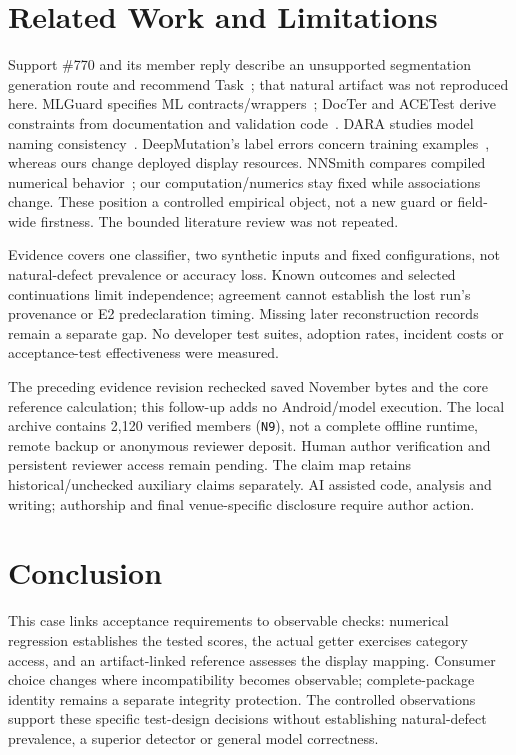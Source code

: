 \documentclass[10pt,conference]{IEEEtran}
\newcommand{\code}[1]{\texttt{#1}}
\begin{document}
\section{Related Work and Limitations}
\label{sec:related}
Support \#770 and its member reply describe an unsupported segmentation generation route and recommend Task~\cite{support770,support770reply}; that natural artifact was not reproduced here. MLGuard specifies ML contracts/wrappers~\cite{mlguard}; DocTer and ACETest derive constraints from documentation and validation code~\cite{docter,acetest}. DARA studies model naming consistency~\cite{dara}. DeepMutation's label errors concern training examples~\cite{deepmutation}, whereas ours change deployed display resources. NNSmith compares compiled numerical behavior~\cite{nnsmith}; our computation/numerics stay fixed while associations change. These position a controlled empirical object, not a new guard or field-wide firstness. The bounded literature review was not repeated.

\label{sec:validity}
Evidence covers one classifier, two synthetic inputs and fixed configurations, not natural-defect prevalence or accuracy loss. Known outcomes and selected continuations limit independence; agreement cannot establish the lost run's provenance or E2 predeclaration timing. Missing later reconstruction records remain a separate gap. No developer test suites, adoption rates, incident costs or acceptance-test effectiveness were measured.

The preceding evidence revision rechecked saved November bytes and the core reference calculation; this follow-up adds no Android/model execution. The local archive contains 2,120 verified members (\code{N9}), not a complete offline runtime, remote backup or anonymous reviewer deposit. Human author verification and persistent reviewer access remain pending. The claim map retains historical/unchecked auxiliary claims separately. AI assisted code, analysis and writing; authorship and final venue-specific disclosure require author action.

\section{Conclusion}
This case links acceptance requirements to observable checks: numerical regression establishes the tested scores, the actual getter exercises category access, and an artifact-linked reference assesses the display mapping. Consumer choice changes where incompatibility becomes observable; complete-package identity remains a separate integrity protection. The controlled observations support these specific test-design decisions without establishing natural-defect prevalence, a superior detector or general model correctness.
\end{document}
